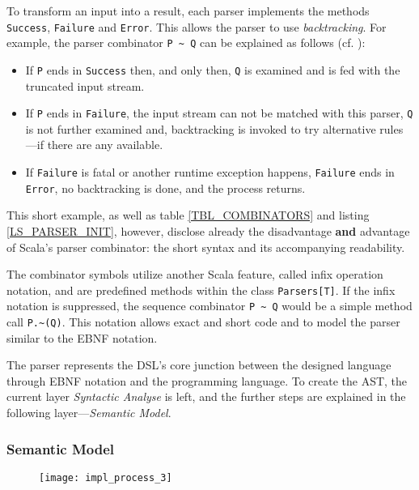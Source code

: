 To transform an input into a result, each parser implements the methods \texttt{Success}, \texttt{Failure} and \texttt{Error}. This allows the parser to use \textit{backtracking}. For example, the parser combinator \lstinline|P ~ Q| can be explained as follows (cf. \cite{Ghosh2010}):

\begin{itemize}
\item If \texttt{P} ends in \texttt{Success} then, and only then, \texttt{Q} is examined and is fed with the truncated input stream.

\item If \texttt{P} ends in \texttt{Failure}, the input stream can not be matched with this parser, \texttt{Q} is not further examined and, backtracking is invoked to try alternative rules—if there are any available.

\item If \texttt{Failure} is fatal or another runtime exception happens, \texttt{Failure} ends in \texttt{Error}, no backtracking is done, and the process returns.
\end{itemize}

This short example, as well as table \ref{TBL_COMBINATORS} and listing \ref{LS_PARSER_INIT}, however, disclose already the disadvantage \textbf{and} advantage of Scala's parser combinator: the short syntax and its accompanying readability.

The combinator symbols utilize another Scala feature, called infix operation notation, and are predefined methods within the class \texttt{Parsers[T]}. If the infix notation is suppressed, the sequence combinator \lstinline|P ~ Q| would be a simple method call \lstinline|P.~(Q)|. This notation allows exact and short code and to model the parser similar to the EBNF notation.\cite{Ghosh2010}

The parser represents the DSL's core junction between the designed language through EBNF notation and the programming language. To create the AST, the current layer \textit{Syntactic Analyse} is left, and the further steps are explained in the following layer—\textit{Semantic Model}.

\subsubsection{Semantic Model}
\label{IMPL_SCALALA_IMPL_SEMANTIC}

\begin{figure}[h]
\centering
\texttt{[image: impl\_process\_3]}
\end{figure}


